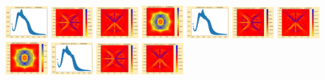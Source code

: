 \documentclass[11pt]{article}
\begin{document}
\includegraphics[width=0.11875\textwidth]{frame0024fig1.png}
\includegraphics[width=0.11875\textwidth]{frame0024fig2.png}
\includegraphics[width=0.11875\textwidth]{frame0024fig3.png}
\includegraphics[width=0.11875\textwidth]{frame0025fig0.png}
\includegraphics[width=0.11875\textwidth]{frame0025fig1.png}
\includegraphics[width=0.11875\textwidth]{frame0025fig2.png}
\includegraphics[width=0.11875\textwidth]{frame0025fig3.png}
\vskip 10pt 
\includegraphics[width=0.11875\textwidth]{frame0026fig0.png}
\includegraphics[width=0.11875\textwidth]{frame0026fig1.png}
\includegraphics[width=0.11875\textwidth]{frame0026fig2.png}
\includegraphics[width=0.11875\textwidth]{frame0026fig3.png}
\end{document}
